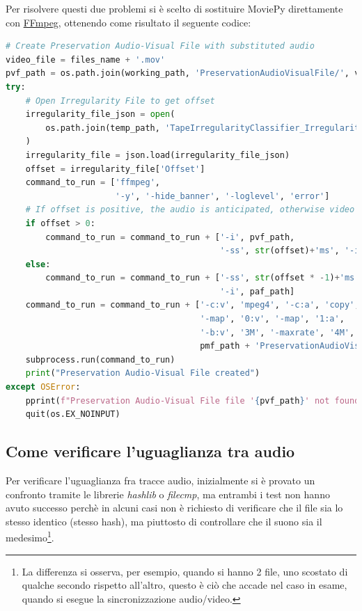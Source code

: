 Per risolvere questi due problemi si è scelto di sostituire MoviePy direttamente con \href{https://ffmpeg.org/}{FFmpeg}, ottenendo come risultato il seguente codice:
\begin{lstlisting}[language=Python, caption=Codice finale; creazione PreservationAudioVisualFile]
# Create Preservation Audio-Visual File with substituted audio
video_file = files_name + '.mov'
pvf_path = os.path.join(working_path, 'PreservationAudioVisualFile/', video_file)
try:
    # Open Irregularity File to get offset
    irregularity_file_json = open(
        os.path.join(temp_path, 'TapeIrregularityClassifier_IrregularityFileOutput2.json')
    )
    irregularity_file = json.load(irregularity_file_json)
    offset = irregularity_file['Offset']
    command_to_run = ['ffmpeg',
                      '-y', '-hide_banner', '-loglevel', 'error']
    # If offset is positive, the audio is anticipated, otherwise video is anticipated (through seek)
    if offset > 0:
        command_to_run = command_to_run + ['-i', pvf_path,
                                           '-ss', str(offset)+'ms', '-i', paf_path]
    else:
        command_to_run = command_to_run + ['-ss', str(offset * -1)+'ms', '-i', pvf_path,
                                           '-i', paf_path]
    command_to_run = command_to_run + ['-c:v', 'mpeg4', '-c:a', 'copy',
                                       '-map', '0:v', '-map', '1:a',
                                       '-b:v', '3M', '-maxrate', '4M', '-bufsize', '4M',
                                       pmf_path + 'PreservationAudioVisualFile.mov']
    subprocess.run(command_to_run)
    print("Preservation Audio-Visual File created")
except OSError:
    pprint(f"Preservation Audio-Visual File file '{pvf_path}' not found!", color=Color.RED)
    quit(os.EX_NOINPUT)
\end{lstlisting}


\subsection{Come verificare l'uguaglianza tra audio} \label{ssec:packager-audio}    %
Per verificare l'uguaglianza fra tracce audio, inizialmente si è provato un confronto tramite le librerie \textit{hashlib} o \textit{filecmp}, ma entrambi i test non hanno avuto successo perchè in alcuni casi non è richiesto di verificare che il file sia lo stesso identico (stesso hash), ma piuttosto di controllare che il suono sia il medesimo\footnote{La differenza si osserva, per esempio, quando si hanno 2 file, uno scostato di qualche secondo rispetto all'altro, questo è ciò che accade nel caso in esame, quando si esegue la sincronizzazione audio/video.}.


